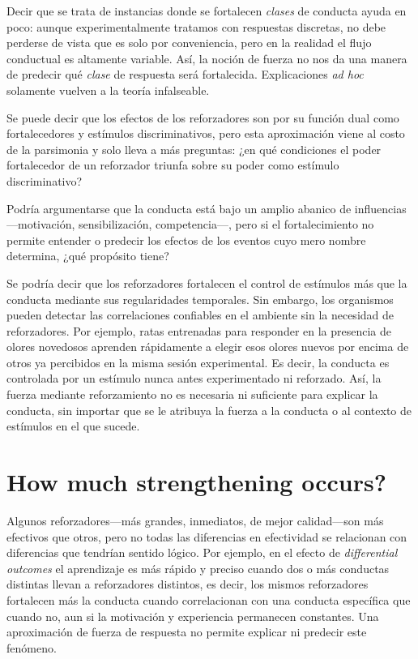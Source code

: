 \documentclass[a4paper,12pt]{article}
\begin{document}
Decir que se trata de instancias donde se fortalecen {\itshape clases} de conducta ayuda en poco: aunque experimentalmente tratamos con respuestas discretas, no debe perderse de vista que es solo por conveniencia, pero en la realidad el flujo conductual es altamente variable. Así, la noción de fuerza no nos da una manera de predecir qué {\itshape clase} de respuesta será fortalecida. Explicaciones {\itshape ad hoc} solamente vuelven a la teoría infalseable.

Se puede decir que los efectos de los reforzadores son por su función dual como fortalecedores y estímulos discriminativos, pero esta aproximación viene al costo de la parsimonia y solo lleva a más preguntas: ¿en qué condiciones el poder fortalecedor de un reforzador triunfa sobre su poder como estímulo discriminativo?

Podría argumentarse que la conducta está bajo un amplio abanico de influencias---motivación, sensibilización, competencia---, pero si el fortalecimiento no permite entender o predecir los efectos de los eventos cuyo mero nombre determina, ¿qué propósito tiene?

Se podría decir que los reforzadores fortalecen el control de estímulos más que la conducta mediante sus regularidades temporales. Sin embargo, los organismos pueden detectar las correlaciones confiables en el ambiente sin la necesidad de reforzadores. Por ejemplo, ratas entrenadas para responder en la presencia de olores novedosos aprenden rápidamente a elegir esos olores nuevos por encima de otros ya percibidos en la misma sesión experimental. Es decir, la conducta es controlada por un estímulo nunca antes experimentado ni reforzado. Así, la fuerza mediante reforzamiento no es necesaria ni suficiente para explicar la conducta, sin importar que se le atribuya la fuerza a la conducta o al contexto de estímulos en el que sucede.

\section{How much strengthening occurs?}

Algunos reforzadores---más grandes, inmediatos, de mejor calidad---son más efectivos que otros, pero no todas las diferencias en efectividad se relacionan con diferencias que tendrían sentido lógico. Por ejemplo, en el efecto de {\itshape differential outcomes} el aprendizaje es más rápido y preciso cuando dos o más conductas distintas llevan a reforzadores distintos, es decir, los mismos reforzadores fortalecen más la conducta cuando correlacionan con una conducta específica que cuando no, aun si la motivación y experiencia permanecen constantes. Una aproximación de fuerza de respuesta no permite explicar ni predecir este fenómeno.
\end{document}
